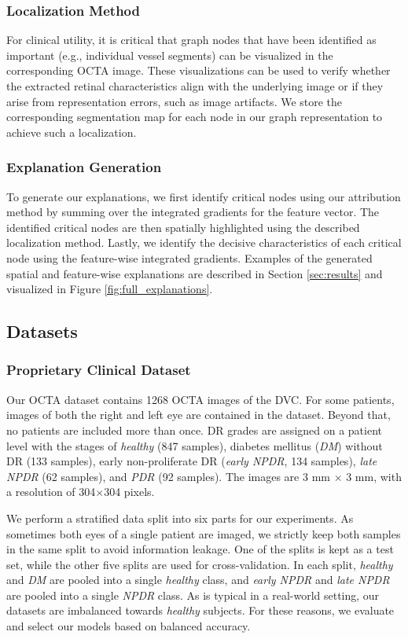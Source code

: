 \subsubsection{Localization Method}
For clinical utility, it is critical that graph nodes that have been identified as important (e.g., individual vessel segments) can be visualized in the corresponding OCTA image. These visualizations can be used to verify whether the extracted retinal characteristics align with the underlying image or if they arise from representation errors, such as image artifacts. We store the corresponding segmentation map for each node in our graph representation to achieve such a localization. 

\subsubsection{Explanation Generation}
To generate our explanations, we first identify critical nodes using our attribution method by summing over the integrated gradients for the feature vector. The identified critical nodes are then spatially highlighted using the described localization method. Lastly, we identify the decisive characteristics of each critical node using the feature-wise integrated gradients. Examples of the generated spatial and feature-wise explanations are described in Section \ref{sec:results} and visualized in Figure \ref{fig:full_explanations}.

\subsection{Datasets}
\subsubsection{Proprietary Clinical Dataset}
Our OCTA dataset contains 1268 OCTA images of the DVC. For some patients, images of both the right and left eye are contained in the dataset. Beyond that, no patients are included more than once. DR grades are assigned on a patient level with the stages of \textit{healthy} (847 samples), diabetes mellitus (\textit{DM}) without DR (133 samples), early non-proliferate DR (\textit{early NPDR}, 134 samples), \textit{late NPDR} (62 samples), and \textit{PDR} (92 samples). The images are 3 mm $\times$ 3 mm, with a resolution of 304$\times$304 pixels.

We perform a stratified data split into six parts for our experiments. As sometimes both eyes of a single patient are imaged, we strictly keep both samples in the same split to avoid information leakage. One of the splits is kept as a test set, while the other five splits are used for cross-validation. In each split, \textit{healthy} and \textit{DM} are pooled into a single \textit{healthy} class, and \textit{early NPDR} and \textit{late NPDR} are pooled into a single \textit{NPDR} class. As is typical in a real-world setting, our datasets are imbalanced towards \textit{healthy} subjects. For these reasons, we evaluate and select our models based on balanced accuracy.

